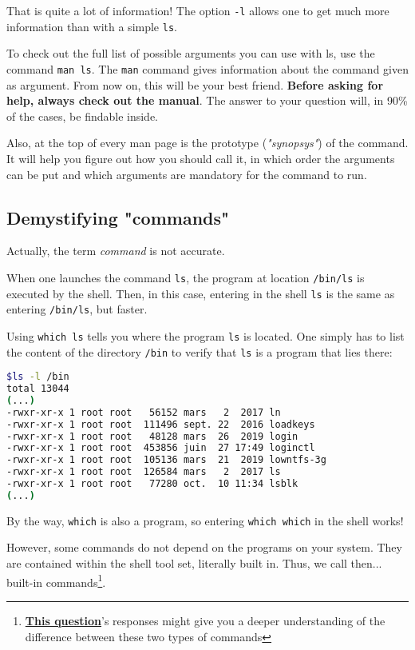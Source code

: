\documentclass[12pt]{article}
\let\oldhref\href
\renewcommand{\href}[2]{\oldhref{#1}{\bfseries#2}}
\begin{document}
That is quite a lot of information! The option \texttt{-l} allows one to get much more information than with a simple \texttt{ls}.

To check out the full list of possible arguments you can use with ls, use the command \texttt{man ls}.
The \texttt{man} command gives information about the command given as argument. From now on, this will be your best friend. \textbf{Before asking for help, always check out the manual}. The answer to your question will, in 90\% of the cases, be findable inside.

Also, at the top of every man page is the prototype (\textit{"synopsys"}) of the command. It will help you figure out how you should call it, in which order the arguments can be put and which arguments are mandatory for the command to run.

\subsection{Demystifying "commands"} \label{demystifying_commands}

Actually, the term \textit{command} is not accurate.

When one launches the command \texttt{ls}, the program at location \texttt{/bin/ls} is executed by the shell. Then, in this case, entering in the shell \texttt{ls} is the same as entering \texttt{/bin/ls}, but faster.

Using \texttt{which ls} tells you where the program \texttt{ls} is located.
One simply has to list the content of the directory \texttt{/bin} to verify that \texttt{ls} is a program that lies there:

\begin{lstlisting}[language=bash]
$ls -l /bin
total 13044
(...)
-rwxr-xr-x 1 root root   56152 mars   2  2017 ln
-rwxr-xr-x 1 root root  111496 sept. 22  2016 loadkeys
-rwxr-xr-x 1 root root   48128 mars  26  2019 login
-rwxr-xr-x 1 root root  453856 juin  27 17:49 loginctl
-rwxr-xr-x 1 root root  105136 mars  21  2019 lowntfs-3g
-rwxr-xr-x 1 root root  126584 mars   2  2017 ls
-rwxr-xr-x 1 root root   77280 oct.  10 11:34 lsblk
(...)
\end{lstlisting}

By the way, \texttt{which} is also a program, so entering \texttt{which which} in the shell works!

However, some commands do not depend on the programs on your system. They are contained within the shell tool set, literally built in. Thus, we call then... built-in commands\footnote{\href{https://unix.stackexchange.com/questions/11454/what-is-the-difference-between-a-builtin-command-and-one-that-is-not}{This question}'s responses might give you a deeper understanding of the difference between these two types of commands}.
\end{document}
